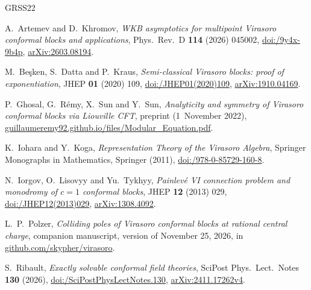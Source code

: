 \documentclass[twoside,10pt]{article}
\numberwithin{equation}{section}
\theoremstyle{slbody}
\theoremstyle{definition}
\theoremstyle{remark}
\begin{document}
{\small
\begin{thebibliography}{GRSS22}
\setlength{\itemsep}{0pt plus 0.5pt}
\setlength{\parskip}{0pt}

A.~Artemev and D.~Khromov,
\emph{WKB asymptotics for multipoint Virasoro conformal blocks and applications},
Phys.\ Rev.\ D \textbf{114} (2026) 045002,
\href{https://doi.org/10.1103/9y4x-9b4p}{doi:/9y4x-9b4p},
\href{https://arxiv.org/abs/2603.08194}{arXiv:2603.08194}.

M.~Be\c{s}ken, S.~Datta and P.~Kraus,
\emph{Semi-classical Virasoro blocks: proof of exponentiation},
JHEP \textbf{01} (2020) 109,
\href{https://doi.org/10.1007/JHEP01(2020)109}{doi:/JHEP01(2020)109},
\href{https://arxiv.org/abs/1910.04169}{arXiv:1910.04169}.

P.~Ghosal, G.~R\'emy, X.~Sun and Y.~Sun,
\emph{Analyticity and symmetry of Virasoro conformal blocks via Liouville CFT},
preprint (1~November 2022),
\href{https://guillaumeremy92.github.io/files/Modular_Equation.pdf}%
{guillaumeremy92.github.io/\allowbreak files/\allowbreak Modular\_Equation.pdf}.

K.~Iohara and Y.~Koga,
\emph{Representation Theory of the Virasoro Algebra},
Springer Monographs in Mathematics, Springer (2011),
\href{https://doi.org/10.1007/978-0-85729-160-8}%
{doi:/978-0-85729-160-8}.

N.~Iorgov, O.~Lisovyy and Yu.~Tykhyy,
\emph{Painlev\'e VI connection problem and monodromy of \(c=1\) conformal blocks},
JHEP \textbf{12} (2013) 029,
\href{https://doi.org/10.1007/JHEP12(2013)029}{doi:/JHEP12(2013)029},
\href{https://arxiv.org/abs/1308.4092}{arXiv:1308.4092}.

L.~P.~Polzer,
\emph{Colliding poles of Virasoro conformal blocks at rational central
charge},
companion manuscript, version of November 25, 2026, in \href{https://github.com/skypher/virasoro}{github.com/skypher/virasoro}.

S.~Ribault,
\emph{Exactly solvable conformal field theories},
SciPost Phys.\ Lect.\ Notes \textbf{130} (2026),
\href{https://doi.org/10.21468/SciPostPhysLectNotes.130}%
{doi:/SciPostPhysLectNotes.130},
\href{https://arxiv.org/abs/2411.17262v4}{arXiv:2411.17262v4}.


\end{thebibliography}}
\end{document}
